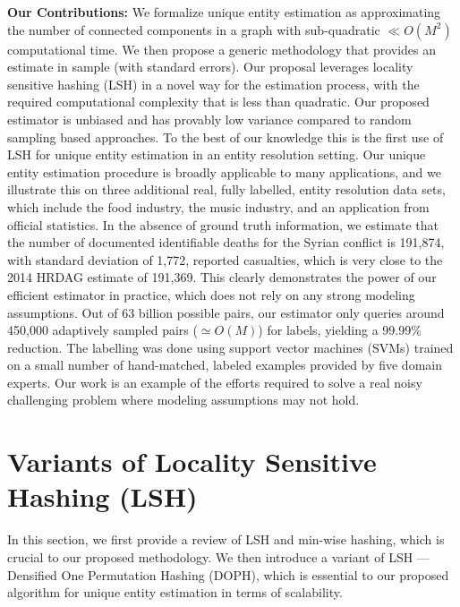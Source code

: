 \documentclass{imsart}
\begin{document}
{\bf Our Contributions:} We formalize unique entity estimation as approximating the number of connected components in a graph with sub-quadratic $\ll O(M^2)$ computational time. We then propose a generic methodology that provides an estimate in sample (with standard errors). Our proposal leverages locality sensitive hashing (LSH) in a novel way for the estimation process, with the required computational complexity that is less than quadratic. Our proposed estimator is unbiased and has provably low variance compared to random sampling based approaches. To the best of our knowledge this is the first use of LSH for unique entity estimation in an entity resolution setting.
%
Our unique entity estimation procedure is broadly applicable to many applications, and we illustrate this on three additional real, fully labelled, entity resolution data sets, which include the food industry, the music industry, and an application from official statistics. In the absence of ground truth information, we estimate that the number of documented identifiable deaths for the Syrian conflict is 191,874, with standard deviation of 1,772, reported casualties, which is very close to the 2014 HRDAG estimate of 191,369. This clearly demonstrates the power of our efficient estimator in practice, which does not rely on any strong modeling assumptions. Out of 63 billion possible pairs, our estimator only queries around 450,000 adaptively sampled pairs ($\simeq O(M)$) for labels, yielding a 99.99\% reduction. The labelling was done using support vector machines (SVMs) trained on a small number of hand-matched, labeled examples provided by five domain experts. Our work is an example of the efforts required to solve a real noisy challenging problem where modeling assumptions may not hold.


\section{Variants of Locality Sensitive Hashing (LSH)}
\label{sec:lsh}
In this section, we first provide a review of LSH and min-wise hashing, which is crucial to our proposed methodology. We then introduce a variant of LSH --- Densified One Permutation Hashing (DOPH), which is essential to our proposed algorithm for unique entity estimation in terms of scalability.
\end{document}
